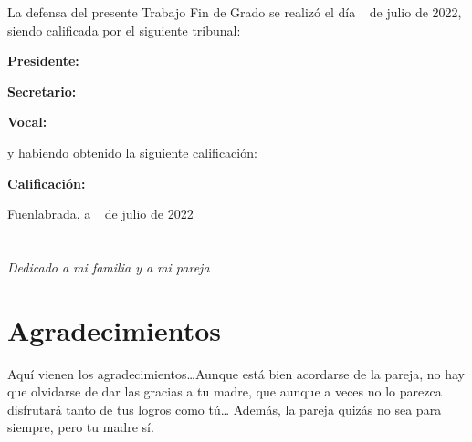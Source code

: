 \documentclass[a4paper, 12pt]{book}
\begin{document}
\vspace{1cm}
La defensa del presente Trabajo Fin de Grado se realizó el día \qquad$\;\,$ de julio de 2022, siendo calificada por el siguiente tribunal:


\vspace{0.5cm}
\textbf{Presidente:}

\vspace{1.2cm}
\textbf{Secretario:}

\vspace{1.2cm}
\textbf{Vocal:}


\vspace{1.2cm}
y habiendo obtenido la siguiente calificación:

\vspace{1cm}
\textbf{Calificación:}


\vspace{1cm}
\begin{flushright}
Fuenlabrada, a \qquad$\;\,$ de julio de 2022
\end{flushright}


\chapter*{}
\begin{flushright}
\textit{Dedicado a mi familia y a mi pareja}
\end{flushright}


\chapter*{Agradecimientos}

Aquí vienen los agradecimientos\ldots Aunque está bien acordarse de la pareja, no hay que olvidarse de dar las gracias a tu madre, que aunque a veces no lo parezca disfrutará tanto de tus logros como tú\ldots
Además, la pareja quizás no sea para siempre, pero tu madre sí.

\end{document}
